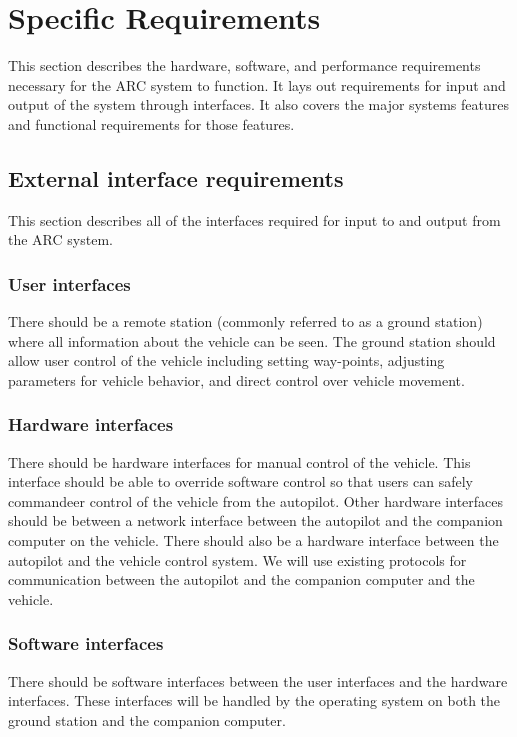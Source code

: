 \documentclass[compsoc,draftclsnofoot,onecolumn,10pt]{IEEEtran}
\begin{document}
\section{Specific Requirements} %
This section describes the hardware, software, and performance requirements
necessary for the ARC system to function. It lays out requirements for
input and output of the system through interfaces. It also covers the major
systems features and functional requirements for those features.

\subsection{External interface requirements}
This section describes all of the interfaces required for input to and output
from the ARC system.
	\subsubsection{User interfaces}
	There should be a remote station (commonly referred to as a ground station) where all information about the vehicle can be seen.
	The ground station should allow user control of the vehicle including setting way-points, adjusting parameters for vehicle behavior, and direct control over vehicle movement.
	
	\subsubsection{Hardware interfaces}
	There should be hardware interfaces for manual control of the vehicle. This	interface should be able to override software control so that users can	safely commandeer control of the vehicle from the autopilot. 
	Other hardware interfaces should be between a network interface between the autopilot and the companion computer on the vehicle.
	There should also be a hardware interface between the autopilot and the vehicle control system.
	We will use existing protocols for communication between the autopilot and the companion computer and the vehicle.

	\subsubsection{Software interfaces}
	There should be software interfaces between the user interfaces and the hardware interfaces. These interfaces will be handled by the operating system on both the ground station and the companion computer.
\end{document}
